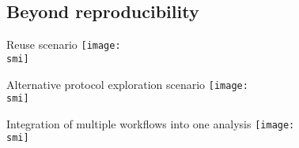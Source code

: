 \documentclass[10pt, usenames, dvipsnames]{beamer}
\def\smi{out/ln/updir/mw-gcthesis-oral/library.bib}
\begin{document}
\subsection{Beyond reproducibility}
\begin{frame}{Reuse scenario}
  \def\smi{out/ln/updir/mw-gcthesis-oral/ink/reproducibility/arrow_reproducibility_exchange_data.pdf}
  \texttt{[image: \\smi]}
\end{frame}
\begin{frame}{Alternative protocol exploration scenario}
  \def\smi{out/ln/updir/mw-gcthesis-oral/ink/reproducibility/arrow_reproducibility_alternative_protocol.pdf}
  \texttt{[image: \\smi]}
\end{frame}
\begin{frame}{Integration of multiple workflows into one analysis}
  \def\smi{out/ln/updir/mw-gcthesis-oral/ink/reproducibility/arrow_reproducibility_integration.pdf}
  \texttt{[image: \\smi]}
\end{frame}
\end{document}
